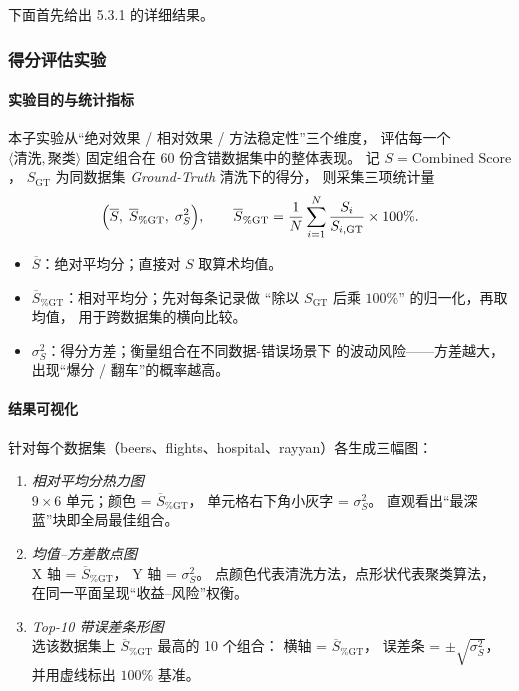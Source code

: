 \documentclass[10pt]{article} %
\numberwithin{equation}{section}
\begin{document}
下面首先给出 5.3.1 的详细结果。

\subsubsection{\textcolor[rgb]{0.00,0.07,1.00}{得分评估实验}}
\label{sec:score_eval_exp}

\paragraph{实验目的与统计指标}
本子实验从“绝对效果 / 相对效果 / 方法稳定性”三个维度，
评估每一个 \(\langle\!\text{清洗},\text{聚类}\!\rangle\) 固定组合在
60 份含错数据集中的整体表现。
记 \(S=\text{Combined Score}\)，
\(S_{\mathrm{GT}}\) 为同数据集 \textit{Ground-Truth} 清洗下的得分，
则采集三项统计量
\[
  \Bigl(
    \overline{S},\;
    \overline{S}_{\%\mathrm{GT}},\;
    \sigma^{2}_{S}
  \Bigr), \qquad
  \overline{S}_{\%\mathrm{GT}}
    =\frac{1}{N}\sum_{i=1}^{N}\frac{S_i}{S_{i,\mathrm{GT}}}\times100\%.
\]

\begin{itemize}[leftmargin=1.9em]
  \item \(\overline{S}\)：绝对平均分；直接对 \(S\) 取算术均值。
  \item \(\overline{S}_{\%\mathrm{GT}}\)：相对平均分；先对每条记录做
        “除以 \(S_{\mathrm{GT}}\) 后乘 \(100\%\)” 的归一化，再取均值，
        用于跨数据集的横向比较。
  \item \(\sigma^{2}_{S}\)：得分方差；衡量组合在不同数据-错误场景下
        的波动风险——方差越大，出现“爆分 / 翻车”的概率越高。
\end{itemize}

\vspace{0.3em}
\paragraph{结果可视化}
针对每个数据集（beers、flights、hospital、rayyan）各生成三幅图：

\begin{enumerate}[label=\arabic*) ,leftmargin=1.2em]
  \item \emph{相对平均分热力图}\\
        \(9\times6\) 单元；颜色 = \(\overline{S}_{\%\mathrm{GT}}\)，
        单元格右下角小灰字 = \(\sigma^{2}_{S}\)。
        直观看出“最深蓝”块即全局最佳组合。
  \item \emph{均值–方差散点图}\\
        X 轴 = \(\overline{S}_{\%\mathrm{GT}}\)，
        Y 轴 = \(\sigma^{2}_{S}\)。
        点颜色代表清洗方法，点形状代表聚类算法，
        在同一平面呈现“收益–风险”权衡。
  \item \emph{Top-10 带误差条形图}\\
        选该数据集上 \(\overline{S}_{\%\mathrm{GT}}\) 最高的 10 个组合：
        横轴 = \(\overline{S}_{\%\mathrm{GT}}\)，
        误差条 = \(\pm\sqrt{\sigma^{2}_{S}}\)，并用虚线标出 \(100\%\) 基准。
\end{enumerate}
\end{document}
